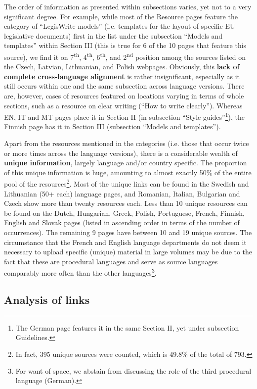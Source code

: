 \documentclass[output=paper]{langsci/langscibook}
\begin{document}
The order of information as presented within subsections varies, yet not to a very significant degree. For example, while most of the Resource pages feature the category of “LegisWrite models” (i.e. templates for the layout of specific EU legislative documents) first in the list under the subsection “Models and templates” within Section III (this is true for 6 of the 10 pages that feature this source), we find it on 7\textsuperscript{th}, 4\textsuperscript{th}, 6\textsuperscript{th}, and 2\textsuperscript{nd} position among the sources listed on the Czech, Latvian, Lithuanian, and Polish webpages. Obviously, this \textbf{lack of complete cross-language alignment} is rather insignificant, especially as it still occurs within one and the same subsection across language versions. There are, however, cases of resources featured on locations varying in terms of whole sections, such as a resource on clear writing (“How to write clearly”). Whereas EN, IT and MT pages place it in Section II (in subsection “Style guides”\footnote{The German page features it in the same Section II, yet under subsection Guidelines.}), the Finnish page has it in Section III (subsection “Models and templates”).

Apart from the resources mentioned in the categories (i.e. those that occur twice or more times across the language versions), there is a considerable wealth of \textbf{unique information}, largely language and/or country specific. The proportion of this unique information is huge, amounting to almost exactly 50\% of the entire pool of the resources\footnote{In fact, 395 unique sources were counted, which is 49.8\% of the total of 793.}. Most of the unique links can be found in the Swedish and Lithuanian (50+ each) language pages, and Romanian, Italian, Bulgarian and Czech show more than twenty resources each. Less than 10 unique resources can be found on the Dutch, Hungarian, Greek, Polish, Portuguese, French, Finnish, English and Slovak pages (listed in ascending order in terms of the number of occurrences). The remaining 9 pages have between 10 and 19 unique sources. The circumstance that the French and English language departments do not deem it necessary to upload specific (unique) material in large volumes may be due to the fact that these are procedural languages and serve as source languages comparably more often than the other languages\footnote{For want of space, we abstain from discussing the role of the third procedural language (German).}.

\subsection{Analysis of links}\label{sec:svoboda:4.4}
\end{document}
